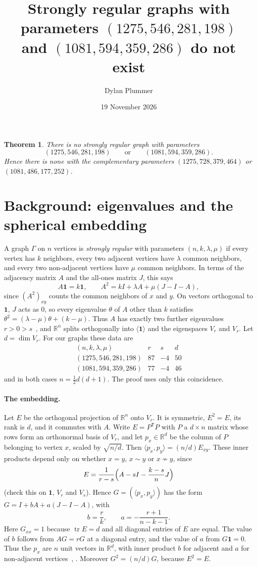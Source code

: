 \documentclass[11pt]{article}
\title{Strongly regular graphs with parameters $(1275,546,281,198)$\\ and $(1081,594,359,286)$ do not exist}
\author{Dylan Plummer}
\date{19 November 2026}
\newtheorem{theorem}{Theorem}
\newcommand{\one}{\mathbf 1}
\begin{document}
\maketitle

\begin{theorem}
There is no strongly regular graph with parameters
\[(1275,546,281,198)\qquad\text{or}\qquad(1081,594,359,286).\]
Hence there is none with the complementary parameters $(1275,728,379,464)$ or $(1081,486,177,252)$.
\end{theorem}

\section{Background: eigenvalues and the spherical embedding}

A graph $\Gamma$ on $n$ vertices is \emph{strongly regular} with parameters $(n,k,\lambda,\mu)$ if every vertex has
$k$ neighbors, every two adjacent vertices have $\lambda$ common neighbors, and every two non-adjacent vertices have
$\mu$ common neighbors. In terms of the adjacency matrix $A$ and the all-ones matrix $J$, this says
\[ A\one=k\one,\qquad A^2=kI+\lambda A+\mu(J-I-A), \]
since $(A^2)_{xy}$ counts the common neighbors of $x$ and $y$. On vectors orthogonal to $\one$, $J$ acts as $0$, so
every eigenvalue $\theta$ of $A$ other than $k$ satisfies $\theta^2=(\lambda-\mu)\theta+(k-\mu)$. Thus $A$ has exactly
two further eigenvalues $r>0>s$~\cite[\S1.1.4]{BvM}, and $\mathbb R^n$ splits orthogonally into $\langle\one\rangle$ and
the eigenspaces $V_r$ and $V_s$. Let $d=\dim V_r$. For our graphs these data are
\[
\begin{array}{lccc}
(n,k,\lambda,\mu)&r&s&d\\\hline
(1275,546,281,198)&87&-4&50\\
(1081,594,359,286)&77&-4&46
\end{array}
\]
and in both cases $n=\tfrac12 d(d+1)$. The proof uses only this coincidence.

\paragraph{The embedding.}
Let $E$ be the orthogonal projection of $\mathbb R^n$ onto $V_r$. It is symmetric, $E^2=E$, its rank is $d$, and it
commutes with $A$. Write $E=P^{\mathsf T}P$ with $P$ a $d\times n$ matrix whose rows form an orthonormal basis of $V_r$,
and let $p_x\in\mathbb R^d$ be the column of $P$ belonging to vertex $x$, scaled by $\sqrt{n/d}$. Then
$\langle p_x,p_y\rangle=(n/d)E_{xy}$. These inner products depend only on whether $x=y$, $x\sim y$ or $x\not\sim y$, since
\[ E=\frac{1}{r-s}\Bigl(A-sI-\frac{k-s}{n}J\Bigr) \]
(check this on $\one$, $V_r$ and $V_s$). Hence $G=(\langle p_x,p_y\rangle)$ has the form $G=I+b A+a(J-I-A)$, with
\[ b=\frac rk,\qquad a=-\frac{r+1}{n-k-1}. \]
Here $G_{xx}=1$ because $\operatorname{tr}E=d$ and all diagonal entries of $E$ are equal. The value of $b$ follows from
$AG=rG$ at a diagonal entry, and the value of $a$ from $G\one=0$. Thus the $p_x$ are $n$ unit vectors in $\mathbb R^d$,
with inner product $b$ for adjacent and $a$ for non-adjacent vertices~\cite[\S1.3.5]{BvM}, \cite{DGS}. Moreover
$G^2=(n/d)G$, because $E^2=E$.
\end{document}
